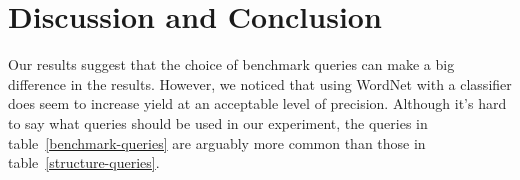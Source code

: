 \documentclass{article}
\begin{document}
\section{Discussion and Conclusion}
Our results suggest that the choice of benchmark queries can make a big difference in the results. However, we noticed that using WordNet with a classifier does seem to increase yield at an acceptable level of precision. Although it's hard to say what queries should be used in our experiment, the queries in table~\ref{benchmark-queries} are arguably more common than those in table~\ref{structure-queries}.




\end{document}
